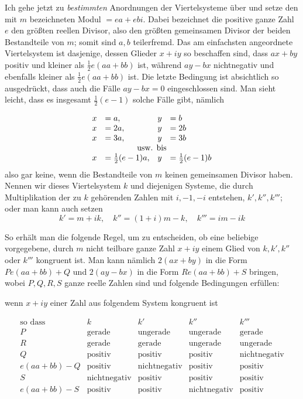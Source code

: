Ich gehe jetzt zu \emph{bestimmten} Anordnungen der Viertelsysteme über und setze den mit $m$ bezeichneten Modul $=ea+ebi$. Dabei bezeichnet die positive ganze Zahl $e$ den größten reellen Divisor, also den größten gemeinsamen Divisor der beiden Bestandteile von $m$; somit sind $a,b$ teilerfremd. Das am einfachsten angeordnete Viertelsystem ist dasjenige, dessen Glieder $x+iy$ so beschaffen sind, dass $ax+by$ positiv und kleiner als $\frac12e(aa+bb)$ ist, während $ay-bx$ nichtnegativ und ebenfalls kleiner als $\frac12e(aa+bb)$ ist. Die letzte Bedingung ist absichtlich so ausgedrückt, dass auch die Fälle $ay-bx=0$ eingeschlossen sind. Man sieht leicht, dass es insgesamt $\frac12(e-1)$ solche Fälle gibt, nämlich

\[
\begin{array}{rlrl}
x&=a,&y&=b\\
x&=2a,&y&=2b\\
x&=3a,&y&=3b\\
\multicolumn{4}{c}{\text{usw. bis}}\\
x&=\frac12(e-1)a,&y&=\frac12(e-1)b
\end{array}
\]
also gar keine, wenn die Bestandteile von $m$ keinen gemeinsamen Divisor
haben. Nennen wir dieses Viertelsystem $k$ und diejenigen Systeme, die durch Multiplikation der zu $k$ gehörenden Zahlen mit $i,-1,-i$ entstehen, $k',k'',k'''$; oder man kann auch setzen
\[
k'=m+ik,\quad k''=(1+i)m-k,\quad k'''=im-ik
\]

So erhält man die folgende Regel, um zu entscheiden, ob eine beliebige vorgegebene, durch $m$ nicht teilbare ganze Zahl $x+iy$ einem Glied von $k,k',k''$ oder $k'''$ kongruent ist. Man kann nämlich $2(ax+by)$ in die Form $Pe(aa+bb)+Q$ und $2(ay-bx)$ in die Form $Re(aa+bb)+S$ bringen, wobei $P,Q,R,S$ ganze reelle Zahlen sind und folgende Bedingungen erfüllen:

\begin{center}wenn $x+iy$ einer Zahl aus folgendem System kongruent ist\end{center}
\begingroup\small\setlength{\arraycolsep}{3pt}
\[
\begin{array}{l||l|l|l|l}
\text{so dass}&k&k'&k''&k'''\\
P&\text{gerade}&\text{ungerade}&\text{ungerade}&\text{gerade}\\
R&\text{gerade}&\text{gerade}&\text{ungerade}&\text{ungerade}\\
Q&\text{positiv}&\text{positiv}&\text{positiv}&\text{nichtnegativ}\\
e(aa+bb)-Q&\text{positiv}&\text{nichtnegativ}&\text{positiv}&\text{positiv}\\
S&\text{nichtnegativ}&\text{positiv}&\text{positiv}&\text{positiv}\\
e(aa+bb)-S&\text{positiv}&\text{positiv}&\text{nichtnegativ}&\text{positiv}
\end{array}
\]
\endgroup

